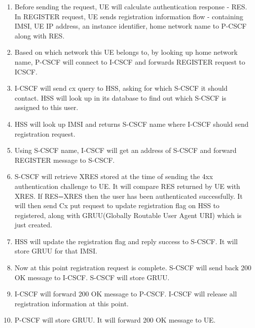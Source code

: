 \documentclass[hidelinks]{report}
\begin{document}
\begin{enumerate}
\item Before sending the request, UE will calculate authentication response - RES. In REGISTER request, UE sends registration information flow - containing IMSI, UE IP address, an instance identifier, home network name to P-CSCF along with RES.
\item Based on which network this UE belongs to, by looking up home network name, P-CSCF will connect to I-CSCF and forwards REGISTER request to ICSCF. 
\item I-CSCF will send cx query to HSS, asking for which S-CSCF it should contact. HSS will look up in its database to find out which S-CSCF is assigned to this user. 
\item HSS will look up IMSI and returns S-CSCF name where I-CSCF should send registration request. 
\item Using S-CSCF name, I-CSCF will get an address of S-CSCF and forward REGISTER message to S-CSCF.
\item S-CSCF will retrieve XRES stored at the time of sending the 4xx authentication challenge to UE. It will compare RES returned by UE with XRES. If RES=XRES then the user has been authenticated successfully. It will then send Cx put request to update registration flag on HSS to registered, along with GRUU(Globally Routable User Agent URI) which is just created.
\item HSS will update the registration flag and reply success to S-CSCF. It will store GRUU for that IMSI.
\item Now at this point registration request is complete. S-CSCF will send back 200 OK message to I-CSCF. S-CSCF will store GRUU.
\item I-CSCF will forward 200 OK message to P-CSCF. I-CSCF will release all registration information at this point.
\item P-CSCF will store GRUU. It will forward 200 OK message to  UE.
\end{enumerate}
\end{document}
